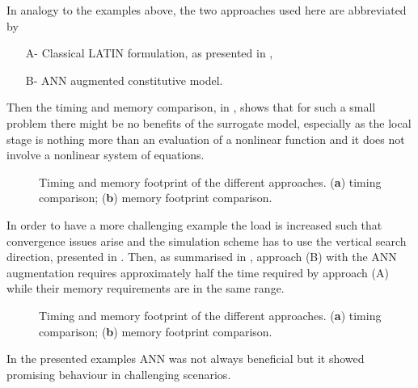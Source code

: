In analogy to the examples above, the two approaches used here are abbreviated by
\begin{enumerate}
	\item[A-] Classical LATIN formulation, as presented in ,
	\item[B-] ANN augmented constitutive model.
\end{enumerate}
Then the timing and memory comparison, in , shows that for such a small problem there might be no benefits of the surrogate model, especially as the local stage is nothing more than an evaluation of a nonlinear function and it does not involve a nonlinear system of equations.
\begin{figure}[hbt!]
	\centering
	\begin{subfigure}[t]{0.49\linewidth}
		
		\caption{}
	\end{subfigure}
	\hfil
	\begin{subfigure}[t]{0.49\linewidth}
		
		\caption{}
	\end{subfigure}
	\caption{Timing and memory footprint of the different approaches. (\textbf{a}) timing comparison; (\textbf{b}) memory footprint comparison.}
	\label{fig_ann_time_1}
\end{figure}
In order to have a more challenging example the load is increased such that convergence issues arise and the simulation scheme has to use the vertical search direction, presented in . Then, as summarised in , approach (B) with the ANN augmentation requires approximately half the time required by approach (A) while their memory requirements are in the same range.
\begin{figure}[hbt!]
	\centering
	\begin{subfigure}[t]{0.49\linewidth}
		
		\caption{}
	\end{subfigure}
	\hfil
	\begin{subfigure}[t]{0.49\linewidth}
		
		\caption{}
	\end{subfigure}
	\caption{Timing and memory footprint of the different approaches. (\textbf{a}) timing comparison; (\textbf{b}) memory footprint comparison.}
	\label{fig_ann_time_2}
\end{figure}
\FloatBarrier
In the presented examples ANN was not always beneficial but it showed promising behaviour in challenging scenarios.


